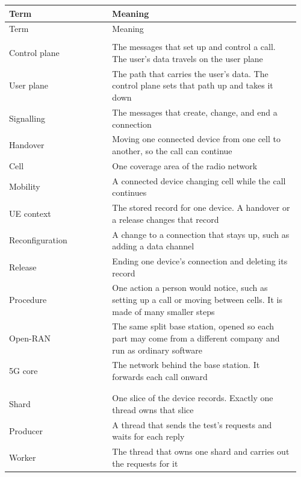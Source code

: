 \documentclass[english,oneside,a4paper,censored,csm,software-track-2020]{HYthesisML}
\begin{document}
\begingroup
\singlespacing
\setlength{\tabcolsep}{4pt}
\renewcommand{\arraystretch}{1.15}
\begin{longtable}{@{}>{\footnotesize\raggedright\arraybackslash}p{0.34\linewidth} >{\footnotesize\raggedright\arraybackslash}p{0.62\linewidth}@{}}
\hline\hline
Term & Meaning \\
\hline
\endfirsthead
\hline\hline
Term & Meaning \\
\hline
\endhead
\multicolumn{2}{@{}l}{\footnotesize\emph{Network}}\\*[2pt]
Control plane & The messages that set up and control a call. The user's data travels on the user plane \\
User plane & The path that carries the user's data. The control plane sets that path up and takes it down \\
Signalling & The messages that create, change, and end a connection \\
Handover & Moving one connected device from one cell to another, so the call can continue \\
Cell & One coverage area of the radio network \\
Mobility & A connected device changing cell while the call continues \\
UE context & The stored record for one device. A handover or a release changes that record \\
Reconfiguration & A change to a connection that stays up, such as adding a data channel \\
Release & Ending one device's connection and deleting its record \\
Procedure & One action a person would notice, such as setting up a call or moving between cells. It is made of many smaller steps \\
Open-RAN & The same split base station, opened so each part may come from a different company and run as ordinary software \\
5G core & The network behind the base station. It forwards each call onward \\
\\[6pt]
\multicolumn{2}{@{}l}{\footnotesize\emph{The service}}\\*[2pt]
Shard & One slice of the device records. Exactly one thread owns that slice \\
Producer & A thread that sends the test's requests and waits for each reply \\
Worker & The thread that owns one shard and carries out the requests for it \\

\end{longtable}
\end{document}
